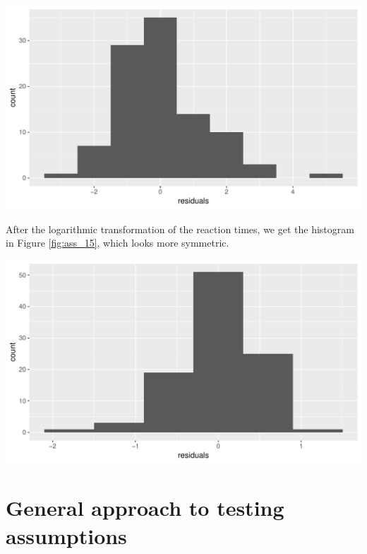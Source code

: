 \documentclass[]{report}\usepackage[]{graphicx}\usepackage[]{color}
\makeatletter
\def\maxwidth{ %
  \ifdim\Gin@nat@width>\linewidth
    \linewidth
  \else
    \Gin@nat@width
  \fi
}
\newenvironment{knitrout}{}{} %
\makeatother
\begin{document}
\begin{knitrout}
\color{fgcolor}

{\centering \includegraphics[width=\maxwidth]{figure/ass_14-1} 

}



\end{knitrout}

After the logarithmic transformation of the reaction times, we get the histogram in Figure \ref{fig:ass_15}, which looks more symmetric. 

\begin{knitrout}
\color{fgcolor}

{\centering \includegraphics[width=\maxwidth]{figure/ass_15-1} 

}



\end{knitrout}


\section{General approach to testing assumptions}
\end{document}
